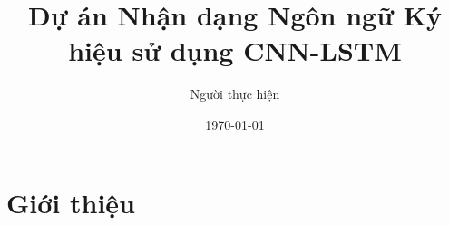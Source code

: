 \documentclass[12pt,a4paper]{article}
\title{Dự án Nhận dạng Ngôn ngữ Ký hiệu sử dụng CNN-LSTM}
\author{Người thực hiện}
\date{\today}
\begin{document}
\maketitle

\tableofcontents
\newpage

\section{Giới thiệu}
\end{document}
